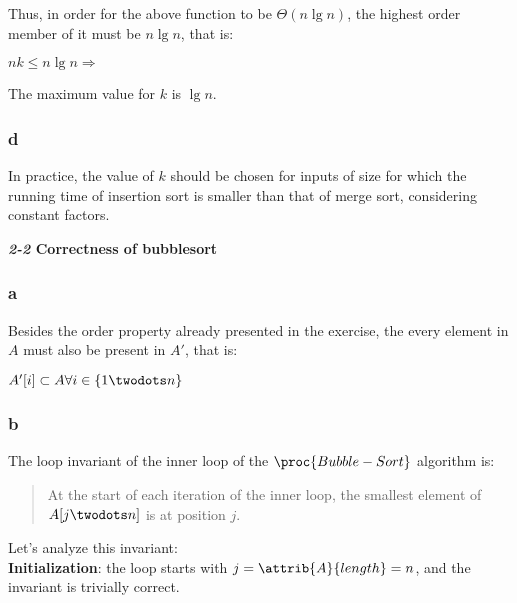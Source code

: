 \documentclass[8pt,a4paper]{article}
\begin{document}
Thus, in order for the above function to be $\Theta(n \lg n)$, the highest order
member of it must be $n \lg n$, that is:

\begin{center}
$nk \leq n \lg n \Rightarrow$
\end{center}

The maximum value for $k$ is $\lg n$.

\subsubsection*{d}

In practice, the value of $k$ should be chosen for inputs of size for which
the running time of insertion sort is smaller than that of merge sort, considering
constant factors.

\newpage

\begin{framed}
  \textbf{\textit{2-2} Correctness of bubblesort}
\end{framed}

\subsubsection*{a}

Besides the order property already presented in the exercise, the every element in $A$
must also be present in $A'$, that is:

\begin{center}
  $A'[i] \subset A \forall i \in \{ 1 \twodots n \}$
\end{center}

\subsubsection*{b}

The loop invariant of the inner loop of the $\proc{Bubble-Sort}$ algorithm is:

\begin{quotation}
  At the start of each iteration of the inner \For loop, the smallest element of
  $A[j \twodots n]$ is at position $j$.
\end{quotation}

Let's analyze this invariant: \\

\textbf{Initialization}: the loop starts with $j = \attrib{A}{length} = n$, and the
invariant is trivially correct. \\
\end{document}
